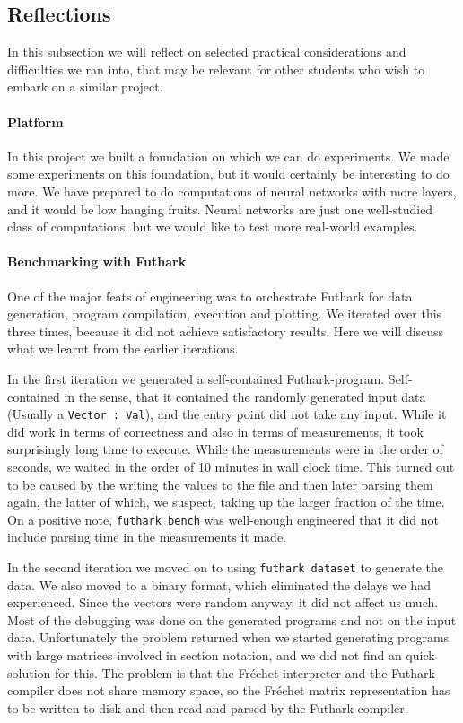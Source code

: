 \subsection{Reflections} In this subsection we will reflect on selected
practical considerations and difficulties we ran into, that may be relevant for
other students who wish to embark on a similar project.

\paragraph{Platform}
In this project we built a foundation on which we can do experiments.  We made
some experiments on this foundation, but it would certainly be interesting to
do more.  We have prepared to do computations of neural networks with more
layers, and it would be low hanging fruits.  Neural networks are just one
well-studied class of computations, but we would like to test more real-world
examples.

\paragraph{Benchmarking with Futhark}
One of the major feats of engineering was to orchestrate Futhark for data
generation, program compilation, execution and plotting.
We iterated over this three times, because it did not achieve satisfactory
results.  Here we will discuss what we learnt from the earlier iterations.

In the first iteration we generated a self-contained Futhark-program.
Self-contained in the sense, that it contained the randomly generated input
data (Usually a \texttt{Vector : Val}), and the entry point did not take any input.
While it did work in terms of correctness and also in terms of measurements, it took
surprisingly long time to execute.  While the measurements were in the order of
seconds, we waited in the order of 10 minutes in wall clock time.  This turned out
to be caused by the writing the values to the file and then later parsing them
again, the latter of which, we suspect, taking up the larger fraction of the time.
On a positive
note, \texttt{futhark bench} was well-enough engineered that it did not include
parsing time in the measurements it made.

In the second iteration we moved on to using \texttt{futhark dataset} to
generate the data.  We also moved to a binary format, which eliminated the
delays we had experienced.  Since the vectors were random anyway, it did not
affect us much.  Most of the debugging was done on the generated programs and
not on the input data.  Unfortunately the problem returned when we started
generating programs with large matrices involved in section notation, and we did
not find an quick solution for this.  The problem is that the Fréchet
interpreter and the Futhark compiler does not share memory space, so the Fréchet
matrix representation has to be written to disk and then read and parsed by the
Futhark compiler.

